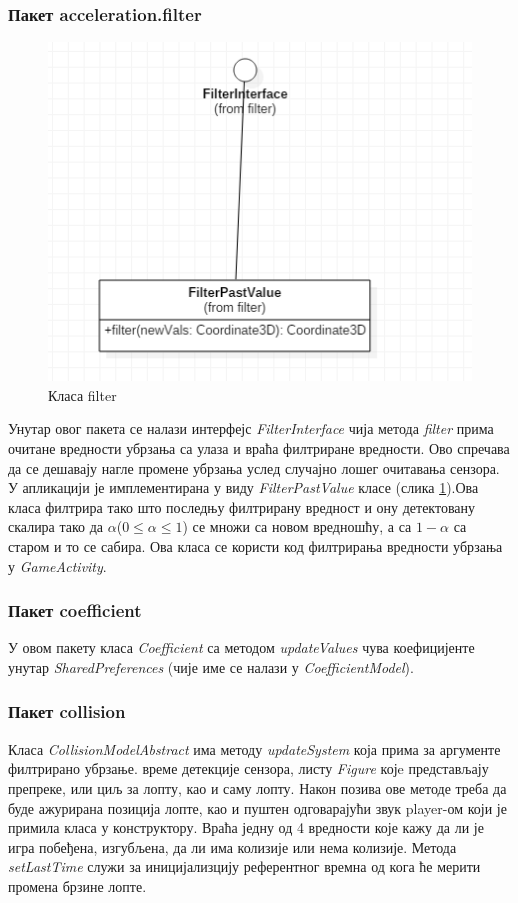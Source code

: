 \subsubsection{Пакет acceleration.filter}
\begin{figure}[htb!]
\begin{center}
\includegraphics[scale=.6]{pictures/UML/class/filter}
\caption{Класа filter}\label{fig:umlClassFilter}
\end{center}
\end{figure}

Унутар овог пакета се налази интерфејс \emph{FilterInterface} чија метода \emph{filter} прима очитане вредности убрзања са улаза и враћа филтриране вредности. Ово спречава да се дешавају нагле промене убрзања услед случајно лошег очитавања сензора. У апликацији је имплементирана у виду \emph{FilterPastValue} класе (слика \ref{fig:umlClassFilter}).Ова класа филтрира тако што последњу филтрирану вредност и ону детектовану скалира тако да $\alpha$($0 \leq \alpha \leq 1$) се множи са новом вредношћу, а са $1-\alpha$ са старом и то се сабира. Ова класа се користи код филтрирања вредности убрзања у \emph{GameActivity}. 

\subsubsection{Пакет coefficient}
У овом пакету класа \emph{Coefficient} са методом \emph{updateValues} чува коефицијенте унутар \emph{SharedPreferences} (чије име се налази у \emph{CoefficientModel}). 
\subsubsection{Пакет collision}
Класа \emph{CollisionModelAbstract} има методу \emph{updateSystem} која прима за аргументе филтрирано убрзање. време детекције сензора, листу  \emph{Figure} којe представљају препреке, или циљ за лопту, као и саму лопту. Након позива ове методе треба да буде ажурирана позиција лопте, као и пуштен одговарајући звук player-ом који је примила класа у конструктору. Враћа једну од 4 вредности које кажу да ли је игра побеђена, изгубљена, да ли има колизије или нема колизије. Метода \emph{setLastTime} служи за иницијализцију референтног времна од кога ће мерити промена брзине лопте.
